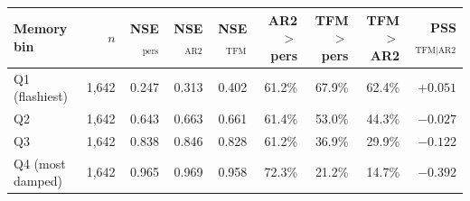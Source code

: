 \footnotesize\setlength{\tabcolsep}{3pt}
\begin{tabular}{lrrrrrrrr}
\toprule
Memory bin & $n$ & NSE$_{\text{pers}}$ & NSE$_{\text{AR2}}$ & NSE$_{\text{TFM}}$ & AR2$>$pers & TFM$>$pers & TFM$>$AR2 & PSS$_{\text{TFM}\mid\text{AR2}}$ \\
\midrule
Q1 (flashiest) & 1,642 & 0.247 & 0.313 & 0.402 & 61.2\% & 67.9\% & 62.4\% & $+0.051$ \\
Q2 & 1,642 & 0.643 & 0.663 & 0.661 & 61.4\% & 53.0\% & 44.3\% & $-0.027$ \\
Q3 & 1,642 & 0.838 & 0.846 & 0.828 & 61.2\% & 36.9\% & 29.9\% & $-0.122$ \\
Q4 (most damped) & 1,642 & 0.965 & 0.969 & 0.958 & 72.3\% & 21.2\% & 14.7\% & $-0.392$ \\
\bottomrule
\end{tabular}
